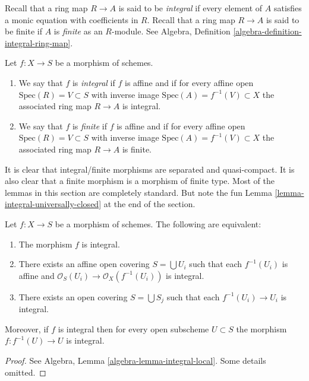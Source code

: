 \noindent
Recall that a ring map $R \to A$ is said to be {\it integral}
if every element of $A$ satisfies a monic equation with
coefficients in $R$. Recall that a ring map $R \to A$ is
said to be finite if $A$ is {\it finite} as an $R$-module.
See Algebra, Definition \ref{algebra-definition-integral-ring-map}.

\begin{definition}
\label{definition-integral}
Let $f : X \to S$ be a morphism of schemes.
\begin{enumerate}
\item We say that $f$ is {\it integral} if $f$ is affine
and if for every affine open $\text{Spec}(R) = V \subset S$
with inverse image $\text{Spec}(A) = f^{-1}(V) \subset X$
the associated ring map $R \to A$ is integral.
\item We say that $f$ is {\it finite} if $f$ is affine
and if for every affine open $\text{Spec}(R) = V \subset S$
with inverse image $\text{Spec}(A) = f^{-1}(V) \subset X$
the associated ring map $R \to A$ is finite.
\end{enumerate}
\end{definition}

\noindent
It is clear that integral/finite morphisms are separated and
quasi-compact. It is also clear that a finite morphism is a
morphism of finite type. Most of the lemmas in this section are
completely standard.
But note the fun Lemma \ref{lemma-integral-universally-closed}
at the end of the section.

\begin{lemma}
\label{lemma-integral-local}
Let $f : X \to S$ be a morphism of schemes.
The following are equivalent:
\begin{enumerate}
\item The morphism $f$ is integral.
\item There exists an affine open covering $S = \bigcup U_i$ such that
each $f^{-1}(U_i)$ is affine and
$\mathcal{O}_S(U_i) \to \mathcal{O}_X(f^{-1}(U_i))$ is integral.
\item There exists an open covering $S = \bigcup S_j$
such that each $f^{-1}(U_i) \to U_i$ is integral.
\end{enumerate}
Moreover, if $f$ is integral then for every open subscheme
$U \subset S$ the morphism $f : f^{-1}(U) \to U$ is integral.
\end{lemma}

\begin{proof}
See Algebra, Lemma \ref{algebra-lemma-integral-local}.
Some details omitted.
\end{proof}

